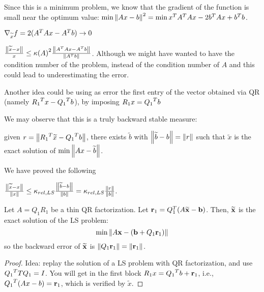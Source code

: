 \documentclass[computational_mathematics.tex]{subfiles}
\begin{document}
  Since this is a minimum problem, we know that the gradient of the function is small near the optimum value: $\min {\left\lVert Ax - b\right\rVert}^2 = \min {x}^{T} {A}^{T} A x  - 2 {b}^{T} A x + {b}^{T} b$.

  $\nabla_{\widetilde{x}} f = 2 ({A}^{T} A x - {A}^{T} b) \to 0$

  \begin{theorem}
    $\frac{\left\lVert\widetilde{x} - x\right\rVert}{x} \le {\kappa(A)}^2 \frac{\left\lVert{A}^{T} A x - {A}^{T} b\right\rVert}{\left\lVert{A}^{T} b\right\rVert}$. Although we might have wanted to have the condition number of the problem, instead of the condition number of $A$ and this could lead to underestimating the error.
  \end{theorem}

Another idea could be using as error the first entry of the vector obtained via QR (namely ${R_1}^{T} x - {Q_1}^{T} b$), by imposing $R_1 x = {Q_1}^{T} b$

We may observe that this is a truly backward stable measure:

given $r = \left\lVert{R_1}^{T} \widetilde{x} - {Q_1}^{T} b\right\rVert$, there exists $\widetilde{b}$ with $\left\lVert\widetilde{b} - b\right\rVert = \left\lVert r\right\rVert$ such that $\widetilde{x}$ is the exact solution of $\min \left\lVert Ax - \widetilde{b}\right\rVert$.

We have proved the following

\begin{proposition}
  $\frac{\left\lVert\widetilde{x} - x\right\rVert}{\left\lVert x\right\rVert} \le \kappa_{rel, LS} \frac{\left\lVert\widetilde{b} - b\right\rVert}{\left\lVert b\right\rVert} = \kappa_{rel, LS} \frac{\left\lVert r\right\rVert}{\left\lVert b\right\rVert}$.
\end{proposition}


\begin{theorem}
  Let $A=Q_1R_1$ be a thin QR factorization. Let $\mathbf{r}_1 = Q_1^T(A\widetilde{\mathbf{x}}-\mathbf{b})$. Then, $\widetilde{\mathbf{x}}$ is the exact solution of the LS problem:
\[
\min \left\lVert A\mathbf{x} - (\mathbf{b}+Q_1\mathbf{r}_1)\right\rVert
\]
so the backward error of $\widetilde{\mathbf{x}}$ is $\left\lVert Q_1\mathbf{r}_1\right\rVert = \left\lVert\mathbf{r}_1\right\rVert$.
\end{theorem}

\begin{proof}
  Idea: replay the solution of a LS problem with QR factorization, and use ${Q_1}^{T}TQ_1=I$. You will get in the first block $R_1 x = {Q_1}^{T} b + \mathbf{r}_1$, i.e., ${Q_1}^{T}(Ax-b)=\mathbf{r}_1$, which is verified by $\widetilde{x}$.
\end{proof}
\end{document}
